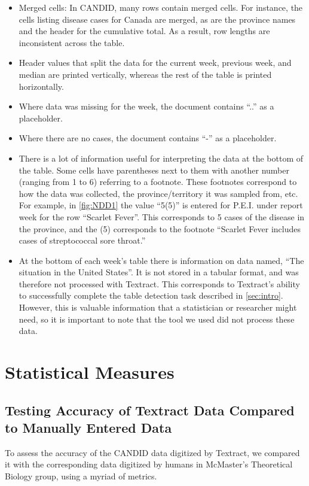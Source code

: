 \documentclass[12pt]{article}
\begin{document}
\begin{itemize}
    \item Merged cells: In CANDID, many rows contain merged cells. For instance, the cells listing disease cases for Canada are merged, as are the province names and the header for the cumulative total. As a result, row lengths are inconsistent across the table.
    \item Header values that split the data for the current week, previous week, and median are printed vertically, whereas the rest of the table is printed horizontally.
    \item Where data was missing for the week, the document contains ``..'' as a placeholder.
    \item Where there are no cases, the document contains ``-'' as a placeholder.
    \item There is a lot of information useful for interpreting the data at the bottom of the table. Some cells have parentheses next to them with another number (ranging from 1 to 6) referring to a footnote. These footnotes correspond to how the data was collected, the province/territory it was sampled from, etc. For example, in \cref{fig:NDD1} the value ``5(5)'' is entered for P.E.I. under report week for the row ``Scarlet Fever''. This corresponds to 5 cases of the disease in the province, and the (5) corresponds to the footnote ``Scarlet Fever includes cases of streptococcal sore throat.''
    \item At the bottom of each week's table there is information on data named, ``The situation in the United States''. It is not stored in a tabular format, and was therefore not processed with Textract. This corresponds to Textract's ability to successfully complete the table detection task described in \cref{sec:intro}. However, this is valuable information that a statistician or researcher might need, so it is important to note that the tool we used did not process these data.
\end{itemize}




\section{Statistical Measures} \label{sec:measuresAccuracy}

\subsection{Testing Accuracy of Textract Data Compared to Manually Entered Data}
To assess the accuracy of the CANDID data digitized by Textract, we compared it with the corresponding data digitized by humans in McMaster's Theoretical Biology group, using a myriad of metrics.
\end{document}
